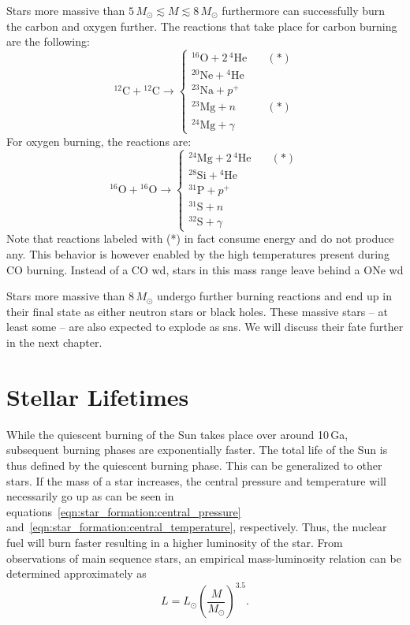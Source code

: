 Stars more massive than $5\,M_\odot \lesssim M \lesssim 8\,M_\odot$ furthermore can successfully burn the carbon and oxygen further. The reactions that take place for carbon burning are the following:
\begin{equation}
    {^{12}}\mathrm{C} + {^{12}}\mathrm{C} \longrightarrow 
    \begin{cases}
        {^{16}}\mathrm{O} + 2\,{^4}\mathrm{He} \quad &(*)\\
        {^{20}}\mathrm{Ne} + {^4}\mathrm{He}\\
        {^{23}}\mathrm{Na} + p^+\\
        {^{23}}\mathrm{Mg} + n \quad &(*)\\
        {^{24}}\mathrm{Mg} + \gamma
    \end{cases}
\end{equation}
For oxygen burning, the reactions are:
\begin{equation}
{^{16}}\mathrm{O} + {^{16}}\mathrm{O} \longrightarrow 
    \begin{cases}
        {^{24}}\mathrm{Mg} + 2\,{^4}\mathrm{He} \quad & (*)\\
        {^{28}}\mathrm{Si} + {^4}\mathrm{He}\\
        {^{31}}\mathrm{P} + p^+\\
        {^{31}}\mathrm{S} + n\\
        {^{32}}\mathrm{S} + \gamma
    \end{cases}
\end{equation}
Note that reactions labeled with (*) in fact consume energy and do not produce any. This behavior is however enabled by the high temperatures present during CO burning. Instead of a CO \ac{wd}, stars in this mass range leave behind a ONe \ac{wd}

Stars more massive than $8\,M_\odot$ undergo further burning reactions and end up in their final state as either neutron stars or black holes. These massive stars -- at least some -- are also expected to explode as \acp{sn}. We will discuss their fate further in the next chapter.


\section{Stellar Lifetimes}

While the quiescent burning of the Sun takes place over around 10\,Ga, subsequent burning phases are exponentially faster. The total life of the Sun is thus defined by the quiescent burning phase. This can be generalized to other stars. If the mass of a star increases, the central pressure and temperature will necessarily go up as can be seen in equations~\eqref{eqn:star_formation:central_pressure} and~\eqref{eqn:star_formation:central_temperature}, respectively. Thus, the nuclear fuel will burn faster resulting in a higher luminosity of the star. From observations of main sequence stars, an empirical mass-luminosity relation can be determined approximately as
\begin{equation}
    L = L_\odot \left(\frac{M}{M_\odot}\right)^{3.5}. \label{eqn:sun:mass_luminosity_relation}
\end{equation}

